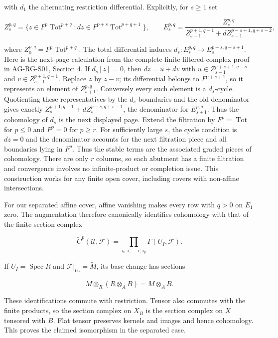 \documentclass[11pt,a4paper,openany]{report}
\begin{document}
with \(d_1\) the alternating restriction differential. Explicitly, for \(s\geq1\) set

\[
Z_s^{p,q}=\{z\in F^p\operatorname{Tot}^{p+q}:dz\in F^{p+s}\operatorname{Tot}^{p+q+1}\},
\qquad
E_s^{p,q}=\frac{Z_s^{p,q}}
{Z_{s-1}^{p+1,q-1}+dZ_{s-1}^{p-s+1,q+s-2}},
\]

where \(Z_0^{p,q}=F^p\operatorname{Tot}^{p+q}\). The total differential induces \(d_s:E_s^{p,q}\to E_s^{p+s,q-s+1}\). Here is the next-page calculation from the complete finite filtered-complex proof in AG-RG-S01, Section 4. If \(d_s[z]=0\), then \(dz=u+dv\) with \(u\in Z_{s-1}^{p+s+1,q-s}\) and \(v\in Z_{s-1}^{p+1,q-1}\). Replace \(z\) by \(z-v\); its differential belongs to \(F^{p+s+1}\), so it represents an element of \(Z_{s+1}^{p,q}\). Conversely every such element is a \(d_s\)-cycle. Quotienting these representatives by the \(d_s\)-boundaries and the old denominator gives exactly \(Z_s^{p+1,q-1}+dZ_s^{p-s,q+s-1}\), the denominator for \(E_{s+1}^{p,q}\). Thus the cohomology of \(d_s\) is the next displayed page. Extend the filtration by \(F^p=\operatorname{Tot}\) for \(p\leq0\) and \(F^p=0\) for \(p\geq r\). For sufficiently large \(s\), the cycle condition is \(dz=0\) and the denominator accounts for the next filtration piece and all boundaries lying in \(F^p\). Thus the stable terms are the associated graded pieces of cohomology. There are only \(r\) columns, so each abutment has a finite filtration and convergence involves no infinite-product or completion issue. This construction works for any finite open cover, including covers with non-affine intersections.

For our separated affine cover, affine vanishing makes every row with \(q>0\) on \(E_1\) zero. The augmentation therefore canonically identifies cohomology with that of the finite section complex

\[
\check C^p(\mathcal U,\mathcal F)=\prod_{i_0<\cdots<i_p}\Gamma(U_I,\mathcal F).
\]

If \(U_I=\operatorname{Spec}R\) and \(\mathcal F|_{U_I}=\widetilde M\), its base change has sections

\[
M\otimes_R(R\otimes_A B)=M\otimes_A B.
\]

These identifications commute with restriction. Tensor also commutes with the finite products, so the section complex on \(X_B\) is the section complex on \(X\) tensored with \(B\). Flat tensor preserves kernels and images and hence cohomology. This proves the claimed isomorphism in the separated case.
\end{document}
